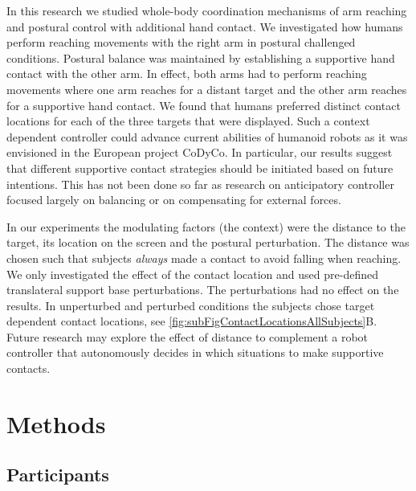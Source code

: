 In this research we studied whole-body coordination mechanisms of arm reaching 
and postural control with additional hand contact. We investigated how humans 
perform reaching movements with the right arm in postural challenged conditions. 
Postural balance was maintained by establishing a supportive hand contact with 
the other arm. In effect, both arms had to perform reaching movements where one 
arm reaches for a distant target and the other arm reaches for a supportive hand 
contact. We found that humans preferred distinct contact locations for each of 
the three targets that were displayed. Such a context dependent controller could 
advance current abilities of humanoid robots as it was envisioned in the 
European project CoDyCo\cite{codyco}. In particular, our results suggest that 
different supportive contact strategies should be initiated based on future intentions. 
This has not been done so far as research on anticipatory controller 
 focused largely on balancing\cite{sugihara2002whole, rueckert2014robust, tassa2012synthesis} or 
 on compensating for external forces\cite{atkeson2007multiple, hyon2007full, ruckert2011study, toussaint2014dual}. 

In our experiments the modulating factors (the context) were the distance to the 
target,  its location on the screen and the postural perturbation. The distance 
was chosen such that subjects \textit{always} made a contact to avoid falling 
when reaching. We only investigated the effect of the contact location and used 
pre-defined translateral support base perturbations. The perturbations had no 
effect on the results. In unperturbed and perturbed conditions the subjects 
chose target dependent contact locations, see \FigureAbbr 
\ref{fig:subFigContactLocationsAllSubjects}B. Future research may explore the 
effect of distance to complement a robot controller that autonomously decides in 
which situations to make supportive contacts. 


\section*{Methods}%

\subsection*{Participants}

